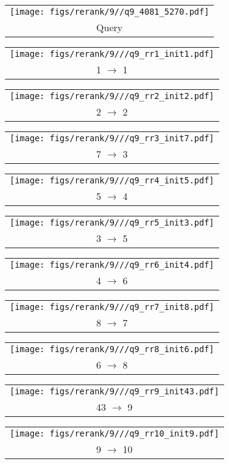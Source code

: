 \begin{figure*}[t]
 \begin{tabular}{@{\sssp}c@{\sssp}}\texttt{[image: figs/rerank/9//q9\_4081\_5270.pdf]}\\Query\\ \end{tabular} 
 \begin{tabular}{@{\sssp}c@{\sssp}}\texttt{[image: figs/rerank/9///q9\_rr1\_init1.pdf]}\\1 $\rightarrow$ 1\\ \end{tabular} 
 \begin{tabular}{@{\sssp}c@{\sssp}}\texttt{[image: figs/rerank/9///q9\_rr2\_init2.pdf]}\\2 $\rightarrow$ 2\\ \end{tabular} 
 \begin{tabular}{@{\sssp}c@{\sssp}}\texttt{[image: figs/rerank/9///q9\_rr3\_init7.pdf]}\\7 $\rightarrow$ 3\\ \end{tabular} 
 \begin{tabular}{@{\sssp}c@{\sssp}}\texttt{[image: figs/rerank/9///q9\_rr4\_init5.pdf]}\\5 $\rightarrow$ 4\\ \end{tabular} 
 \begin{tabular}{@{\sssp}c@{\sssp}}\texttt{[image: figs/rerank/9///q9\_rr5\_init3.pdf]}\\3 $\rightarrow$ 5\\ \end{tabular} 
 \begin{tabular}{@{\sssp}c@{\sssp}}\texttt{[image: figs/rerank/9///q9\_rr6\_init4.pdf]}\\4 $\rightarrow$ 6\\ \end{tabular} 
 \begin{tabular}{@{\sssp}c@{\sssp}}\texttt{[image: figs/rerank/9///q9\_rr7\_init8.pdf]}\\8 $\rightarrow$ 7\\ \end{tabular} 
 \begin{tabular}{@{\sssp}c@{\sssp}}\texttt{[image: figs/rerank/9///q9\_rr8\_init6.pdf]}\\6 $\rightarrow$ 8\\ \end{tabular} 
 \begin{tabular}{@{\sssp}c@{\sssp}}\texttt{[image: figs/rerank/9///q9\_rr9\_init43.pdf]}\\43 $\rightarrow$ 9\\ \end{tabular} 
 \begin{tabular}{@{\sssp}c@{\sssp}}\texttt{[image: figs/rerank/9///q9\_rr10\_init9.pdf]}\\9 $\rightarrow$ 10\\ \end{tabular} 


\end{figure*}
